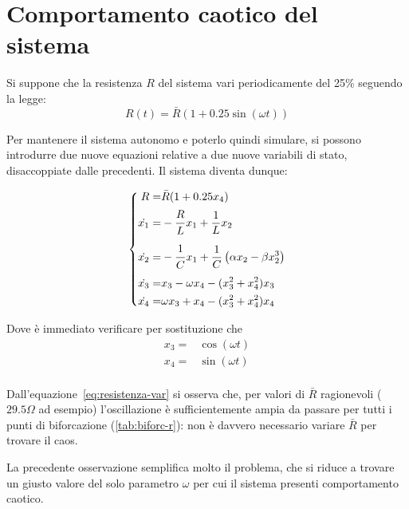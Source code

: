\section{Comportamento caotico del sistema}

Si suppone che la resistenza $R$ del sistema vari periodicamente del 25\% seguendo la legge:
\begin{equation}
    R(t) = \bar{R} (1+0.25 \sin(\omega t))
    \label{eq:resistenza-var}
\end{equation}

Per mantenere il sistema autonomo e poterlo quindi simulare, si possono introdurre due nuove equazioni relative a due nuove variabili di stato, disaccoppiate dalle precedenti.
Il sistema diventa dunque:

\begin{equation}
    \left\{
    \begin{aligned}
        R =& \bar{R} (1+0.25 x_4) \\
        \dot{x_1} =& -\frac{\strut R}{\strut L}x_1 + \frac{1}{L} x_2\\
        \dot{x_2} =& -\frac{\strut 1}{\strut C} x_1 + \frac{1}{C}\left( \alpha x_2 - \beta x_2^3\right)\\
        \dot{x_3} =& x_3 - \omega x_4 - (x_3^2+x_4^2) x_3 \\
        \dot{x_4} =& \omega x_3 + x_4 - (x_3^2+x_4^2) x_4 \\
    \end{aligned}
    \right.
    \label{eq:sistema-chaos}
\end{equation}

Dove è immediato verificare per sostituzione che
\begin{equation}
    \begin{aligned}
        x_3 =& \cos (\omega t)\\
        x_4 =& \sin (\omega t)\\
    \end{aligned}
\end{equation}

Dall'equazione~\ref{eq:resistenza-var} si osserva che, per valori di $\bar{R}$ ragionevoli ($29.5 \Omega$ ad esempio) l'oscillazione è sufficientemente ampia da passare per tutti i punti di biforcazione (\autoref{tab:biforc-r}): non è davvero necessario variare $\bar{R}$ per trovare il caos.

La precedente osservazione semplifica molto il problema, che si riduce a trovare un giusto valore del solo parametro $\omega$ per cui il sistema presenti comportamento caotico.

